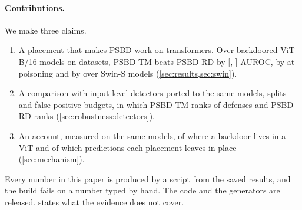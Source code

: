 \paragraph{Contributions.} We make three claims.

\begin{enumerate}
  \item A placement that makes PSBD work on transformers. Over \PanelCellsCached{}
    backdoored ViT-B/16 models on \PanelDatasetsCached{} datasets, PSBD-TM beats
    PSBD-RD by \HeadlineGainAdaptiveAuroc{} [\HeadlineGainAdaptiveAurocLow{},
    \HeadlineGainAdaptiveAurocHigh{}] AUROC, by \GainsLowestRate{} at
    \PanelRateLow{} poisoning and by \SwinGainRecommendedMinusPublished{} over
    \SwinCells{} Swin-S models (\cref{sec:results,sec:swin}).
  \item A comparison with \DetectorsComparedCount{} input-level detectors ported to
    the same models, splits and false-positive budgets, in which PSBD-TM ranks
    \DetectorsAurocRankOurs{} of \DetectorsAurocDefensesRanked{} defenses and PSBD-RD ranks
    \DetectorsAurocRankPublished{} (\cref{sec:robustness:detectors}).
  \item An account, measured on the same models, of where a backdoor lives in a
    ViT and of which predictions each placement leaves in place
    (\cref{sec:mechanism}).
\end{enumerate}

Every number in this paper is produced by a script from the saved results, and
the build fails on a number typed by hand. The code and the generators are
released.  states what the evidence does not cover.
